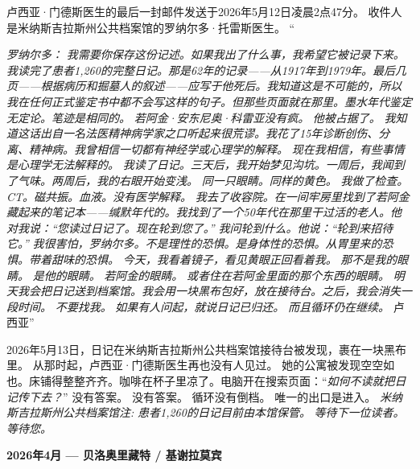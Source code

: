 \noindent 卢西亚·门德斯医生的最后一封邮件发送于2026年5月12日凌晨2点47分。
\noindent 收件人是米纳斯吉拉斯州公共档案馆的罗纳尔多·托雷斯医生。
\noindent \textquotedblleft{\textit{罗纳尔多：}
\noindent \textit{我需要你保存这份记述。如果我出了什么事，我希望它被记录下来。}
\noindent \textit{我读完了患者1,260的完整日记。那是62年的记录——从1917年到1979年。最后几页——根据病历和掘墓人的叙述——应写于他死后。我知道这是不可能的，所以我在任何正式鉴定书中都不会写这样的句子。但那些页面就在那里。墨水年代鉴定无定论。笔迹是相同的。}
\noindent \textit{若阿金·安东尼奥·科雷亚没有疯。}
\noindent \textit{他被占据了。}
\noindent \textit{我知道这话出自一名法医精神病学家之口听起来很荒谬。我花了15年诊断创伤、分离、精神病。我曾相信一切都有神经学或心理学的解释。}
\noindent \textit{现在我相信，有些事情是心理学无法解释的。}
\noindent \textit{我读了日记。三天后，我开始梦见沟坑。一周后，我闻到了气味。两周后，我的右眼开始变浅。}
\noindent \textit{同一只眼睛。同样的黄色。}
\noindent \textit{我做了检查。CT。磁共振。血液。没有医学解释。}
\noindent \textit{我去了收容院。在一间牢房里找到了若阿金藏起来的笔记本——缄默年代的。我找到了一个50年代在那里干过活的老人。他对我说：\textquotedblleft{}您读过日记了。现在轮到您了。\textquotedblright{}}
\noindent \textit{我问轮到什么。他说：\textquotedblleft{}轮到来招待它。\textquotedblright{}}
\noindent \textit{我很害怕，罗纳尔多。不是理性的恐惧。是身体性的恐惧。从胃里来的恐惧。带着甜味的恐惧。}
\noindent \textit{今天，我看着镜子，看见黄眼正回看着我。}
\noindent \textit{那不是我的眼睛。}
\noindent \textit{是他的眼睛。}
\noindent \textit{若阿金的眼睛。}
\noindent \textit{或者住在若阿金里面的那个东西的眼睛。}
\noindent \textit{明天我会把日记送到档案馆。我会用一块黑布包好，放在接待台。之后，我会消失一段时间。}
\noindent \textit{不要找我。}
\noindent \textit{如果有人问起，就说日记已归还。}
\noindent \textit{而且循环仍在继续。}
\noindent 卢西亚\textquotedblright{}

\noindent 2026年5月13日，日记在米纳斯吉拉斯州公共档案馆接待台被发现，裹在一块黑布里。
\noindent 从那时起，卢西亚·门德斯医生再也没有人见过。
\noindent 她的公寓被发现空空如也。床铺得整整齐齐。咖啡在杯子里凉了。电脑开在搜索页面：\textquotedblleft{\textit{如何不读就把日记传下去？}\textquotedblright}
\noindent 没有答案。
\noindent 没有答案。
\noindent 循环没有倒档。
\noindent 唯一的出口是进入。
\noindent \textit{米纳斯吉拉斯州公共档案馆注:}
\noindent \textit{患者1,260的日记目前由本馆保管。}
\noindent \textit{等待下一位读者。}
\noindent \textit{等待您。}

\noindent \textbf{2026年4月 --- 贝洛奥里藏特 / 基谢拉莫宾}

}
